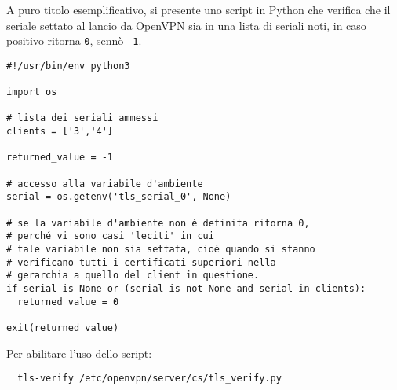 A puro titolo esemplificativo, si presente uno script in Python che
verifica che il seriale settato al lancio da OpenVPN sia in una lista di seriali noti,
in caso positivo ritorna \texttt{0}, sennò \texttt{-1}.
\begin{verbatim}
#!/usr/bin/env python3

import os

# lista dei seriali ammessi
clients = ['3','4']
  
returned_value = -1

# accesso alla variabile d'ambiente
serial = os.getenv('tls_serial_0', None)

# se la variabile d'ambiente non è definita ritorna 0,
# perché vi sono casi 'leciti' in cui
# tale variabile non sia settata, cioè quando si stanno
# verificano tutti i certificati superiori nella
# gerarchia a quello del client in questione.
if serial is None or (serial is not None and serial in clients):
  returned_value = 0
  
exit(returned_value)   
\end{verbatim}
Per abilitare l'uso dello script:
\begin{verbatim}
  tls-verify /etc/openvpn/server/cs/tls_verify.py
\end{verbatim}

